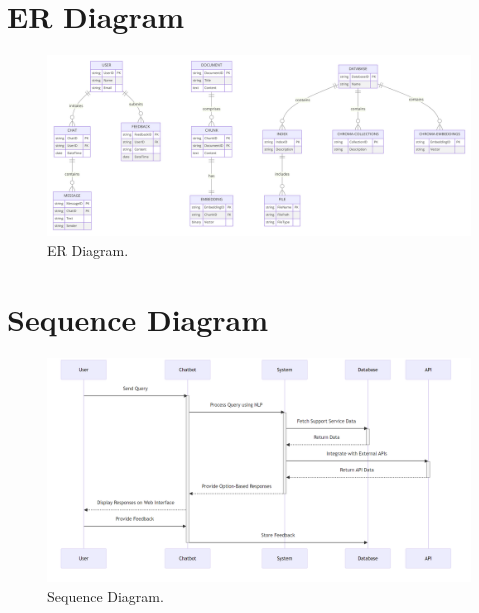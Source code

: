 \documentclass{l4proj}
\begin{document}
\begin{appendices}
\chapter{ER Diagram}
\label{ER Diagram}

\begin{figure}[h!]
  \centering
  \begin{adjustbox}{center,max height=0.4\textheight, max width=\linewidth}
    \includegraphics{images/ER Diagram.png}
  \end{adjustbox}
  \caption{ER Diagram.}
  \label{fig:ER Diagram}
\end{figure}


\chapter{Sequence Diagram}
\label{Sequence Diagram}

\begin{figure}[h!]
  \centering
  \begin{adjustbox}{center,max height=0.45\textheight, max width=\linewidth}
    \includegraphics{images/sequencediagram.png}
  \end{adjustbox}
  \caption{Sequence Diagram.}
  \label{fig:Sequence Diagram}
\end{figure}


\end{appendices}
\end{document}

